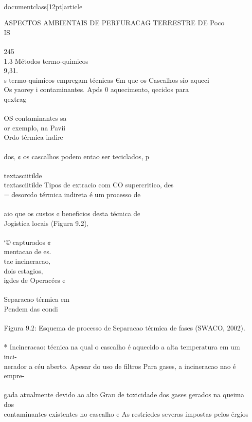 \\documentclass[12pt]{article}
\begin{document}
{{{{ASPECTOS AMBIENTAIS DE PERFURACAG TERRESTRE DE Poco\\
IS\\
\\
245\\
1.3 Métodos termo-quimicos\\
9,31.\\
s termo-quimicos empregam técnicas €m que os Cascalhos sio aqueci\\
Os yaorey i contaminantes. Apds 0 aquecimento, qecidos para\\
qextrag\\
\\
OS contaminantes sa\\
or exemplo, na Pavii\\
Ordo térmica indire\\
\\
dos, ¢ os cascalhos podem entao ser teciclados, p\\
\\textasciitilde{}\\textasciitilde{} Tipos de extracio com CO supercritico, des\\
= desorcdo térmica indireta é um processo de\\
\\
aio que os custos ¢ beneficios desta técnica de\\
Jogistica locais (Figura 9.2),\\
\\
‘© capturados ¢\\
mentacao de es.\\
tae incineracao,\\
dois estagios,\\
igdes de Operacées e\\
\\
Separacao térmica em\\
Pendem das condi\\
\\
Figura 9.2: Esquema de processo de Separacao térmica de fases (SWACO, 2002).\\
\\
* Incineracao: técnica na qual o cascalho é aquecido a alta temperatura em um inci-\\
nerador a céu aberto. Apesar do uso de filtros Para gases, a incineracao nao é empre-\\
\\
gada atualmente devido ao alto Grau de toxicidade dos gases gerados na queima dos\\
contaminantes existentes no cascalho e As restricdes severas impostas pelos érgios\\
}}}}
\end{document}
